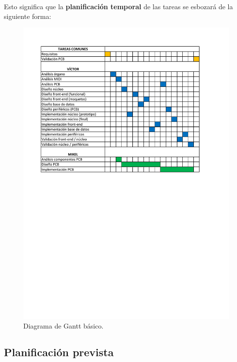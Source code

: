 \smallskip

Esto significa que la \textbf{planificación temporal} de las tareas se esbozará de la siguiente forma:

\smallskip

\begin{figure}[H]
	\noindent \begin{centering}
		\includegraphics[clip=true,trim=50 420 50 50,width=\linewidth*3/4]{capitulo5/plan_gantt}
		\par\end{centering}
	\smallskip
	\caption{\label{fig:plan_gantt} Diagrama de Gantt básico.}
\end{figure} 

\smallskip

\subsection{Planificación prevista}

